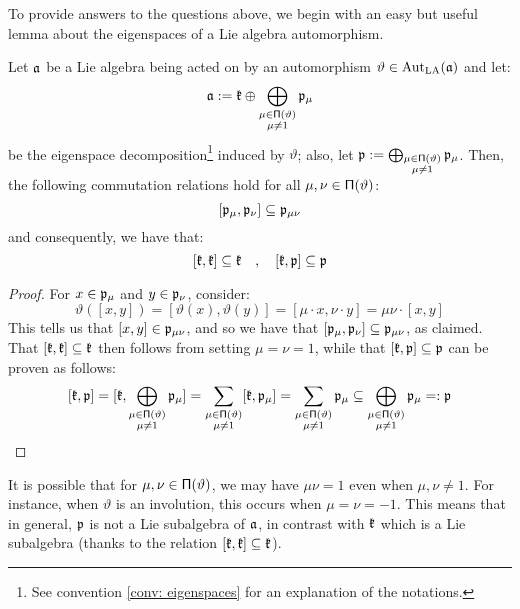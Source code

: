         To provide answers to the questions above, we begin with an easy but useful lemma about the eigenspaces of a Lie algebra automorphism.
        \begin{lemma} \label{lemma: symmetric_space_decompositions}
            Let $\mathfrak{a}$ be a Lie algebra being acted on by an automorphism $\vartheta \in \operatorname{Aut}_{\mathrm{LA}}(\mathfrak{a})$ and let:
                $$\mathfrak{a} := \mathfrak{k} \oplus \bigoplus_{ \substack{\mu \in \mathsf{\Pi}(\vartheta) \\ \mu \not = 1} } \mathfrak{p}_{\mu}$$
            be the eigenspace decomposition\footnote{See convention \ref{conv: eigenspaces} for an explanation of the notations.} induced by $\vartheta$; also, let $\mathfrak{p} := \bigoplus_{ \substack{\mu \in \mathsf{\Pi}(\vartheta) \\ \mu \not = 1} } \mathfrak{p}_{\mu}$. Then, the following commutation relations hold for all $\mu, \nu \in \mathsf{\Pi}(\vartheta)$:
                \begin{equation} \label{equation: symmetric_space_relations}
                    [\mathfrak{p}_{\mu}, \mathfrak{p}_{\nu}] \subseteq \mathfrak{p}_{\mu \nu}
                \end{equation}
            and consequently, we have that:
                $$[\mathfrak{k}, \mathfrak{k}] \subseteq \mathfrak{k} \quad, \quad [\mathfrak{k}, \mathfrak{p}] \subseteq \mathfrak{p}$$
        \end{lemma}
            \begin{proof}
                For $x \in \mathfrak{p}_{\mu}$ and $y \in \mathfrak{p}_{\nu}$, consider:
                    $$\vartheta( [x, y] ) = [ \vartheta(x), \vartheta(y) ] = [\mu \cdot x, \nu \cdot y] = \mu \nu \cdot [x, y]$$
                This tells us that $[x, y] \in \mathfrak{p}_{\mu \nu}$, and so we have that $[\mathfrak{p}_{\mu}, \mathfrak{p}_{\nu}] \subseteq \mathfrak{p}_{\mu \nu}$, as claimed. That $[\mathfrak{k}, \mathfrak{k}] \subseteq \mathfrak{k}$ then follows from setting $\mu = \nu = 1$, while that $[\mathfrak{k}, \mathfrak{p}] \subseteq \mathfrak{p}$ can be proven as follows:
                    $$[\mathfrak{k}, \mathfrak{p}] = [ \mathfrak{k}, \bigoplus_{ \substack{\mu \in \mathsf{\Pi}(\vartheta) \\ \mu \not = 1} } \mathfrak{p}_{\mu} ] = \sum_{ \substack{\mu \in \mathsf{\Pi}(\vartheta) \\ \mu \not = 1} } [\mathfrak{k}, \mathfrak{p}_{\mu}] = \sum_{ \substack{\mu \in \mathsf{\Pi}(\vartheta) \\ \mu \not = 1} } \mathfrak{p}_{\mu} \subseteq \bigoplus_{ \substack{\mu \in \mathsf{\Pi}(\vartheta) \\ \mu \not = 1} } \mathfrak{p}_{\mu} =: \mathfrak{p}$$
            \end{proof}
        \begin{remark}
            It is possible that for $\mu, \nu \in \mathsf{\Pi}(\vartheta)$, we may have $\mu \nu = 1$ even when $\mu, \nu \not = 1$. For instance, when $\vartheta$ is an involution, this occurs when $\mu = \nu = -1$. This means that in general, $\mathfrak{p}$ is not a Lie subalgebra of $\mathfrak{a}$, in contrast with $\mathfrak{k}$ which is a Lie subalgebra (thanks to the relation $[\mathfrak{k}, \mathfrak{k}] \subseteq \mathfrak{k}$).
        \end{remark}    
